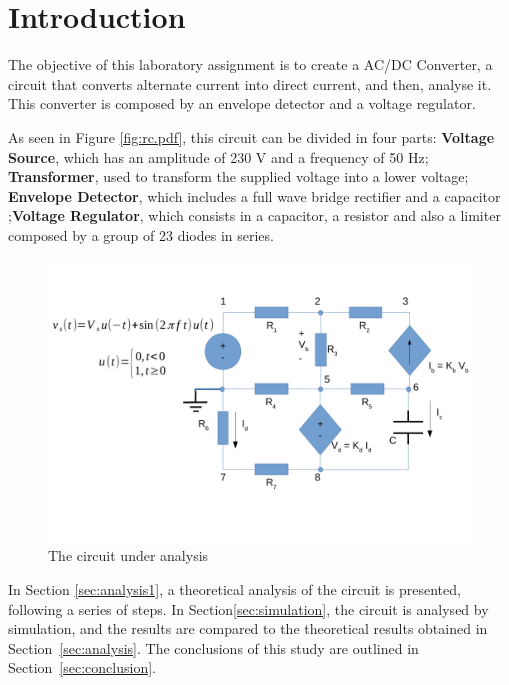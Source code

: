 \section{Introduction}
\label{sec:introduction}

The objective of this laboratory assignment is to create a AC/DC Converter, a circuit that converts alternate current into direct current, and then, analyse it. This converter is composed by an envelope detector and a voltage regulator.

As seen in Figure \ref{fig:rc.pdf}, this circuit can be divided in four parts: \textbf{Voltage Source}, which has an amplitude of 230 V and a frequency of 50 Hz; \textbf{Transformer}, used to transform the supplied voltage into a lower voltage; \textbf{Envelope Detector}, which includes a full wave bridge rectifier and a capacitor ;\textbf{Voltage Regulator}, which consists in a capacitor, a resistor and also a limiter composed by a group of 23 diodes in series.

\begin{figure}[h] \centering
\includegraphics[width=0.8\linewidth]{rc.pdf}
\caption{The circuit under analysis}
\label{fig:rc}
\end{figure}

In Section \ref{sec:analysis1}, a theoretical analysis of the circuit is
presented, following a series of steps. In Section\ref{sec:simulation}, the circuit is analysed by
simulation, and the results are compared to the theoretical results obtained in
Section~\ref{sec:analysis}. The conclusions of this study are outlined in
Section~\ref{sec:conclusion}.





